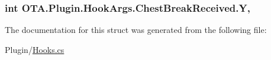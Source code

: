 \subsubsection[{Y}]{\setlength{\rightskip}{0pt plus 5cm}int O\+T\+A.\+Plugin.\+Hook\+Args.\+Chest\+Break\+Received.\+Y\hspace{0.3cm}{\ttfamily [get]}, {\ttfamily [set]}}\label{struct_o_t_a_1_1_plugin_1_1_hook_args_1_1_chest_break_received_acfb63d84c31c9f149216918a82317ebb}


The documentation for this struct was generated from the following file\+:\begin{DoxyCompactItemize}
\item 
Plugin/\hyperlink{_hooks_8cs}{Hooks.\+cs}\end{DoxyCompactItemize}
